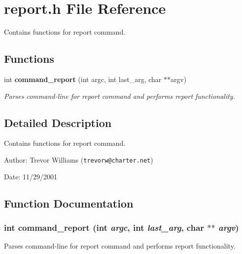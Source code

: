 \section{report.h File Reference}
\label{report_8h}
Contains functions for report command. 


\subsection*{Functions}
\begin{CompactItemize}
\item 
int {\bf command\_\-report} (int argc, int last\_\-arg, char $\ast$$\ast$argv)
\begin{CompactList}\small\item\em Parses command-line for report command and performs report functionality.\item\end{CompactList}\end{CompactItemize}


\subsection{Detailed Description}
Contains functions for report command.

\begin{Desc}
\item[Author:]Trevor Williams ({\tt trevorw@charter.net}) \end{Desc}
\begin{Desc}
\item[Date:]11/29/2001 \end{Desc}


\subsection{Function Documentation}
\subsubsection{\setlength{\rightskip}{0pt plus 5cm}int command\_\-report (int {\em argc}, int {\em last\_\-arg}, char $\ast$$\ast$ {\em argv})}\label{report_8h_a0}


Parses command-line for report command and performs report functionality.

